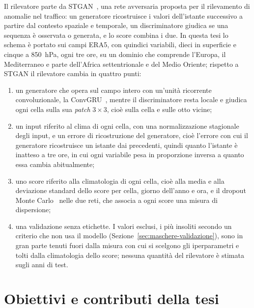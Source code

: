 Il rilevatore parte da STGAN~\cite{deng2022stgan}, una rete avversaria proposta per il rilevamento di anomalie nel traffico: un generatore ricostruisce i valori dell'istante successivo a partire dal contesto spaziale e temporale, un discriminatore giudica se una sequenza è osservata o generata, e lo score combina i due. In questa tesi lo schema è portato sui campi ERA5, con quindici variabili, dieci in superficie e cinque a 850~hPa, ogni tre ore, su un dominio che comprende l'Europa, il Mediterraneo e parte dell'Africa settentrionale e del Medio Oriente; rispetto a STGAN il rilevatore cambia in quattro punti:
\begin{enumerate}
    \item un generatore che opera sul campo intero con un'unità ricorrente convoluzionale, la ConvGRU~\cite{shi2015convlstm,ballas2016convgru}, mentre il discriminatore resta locale e giudica ogni cella sulla sua \emph{patch} $3\times3$, cioè sulla cella e sulle otto vicine;
    \item un input riferito al clima di ogni cella, con una normalizzazione stagionale degli input, e un errore di ricostruzione del generatore, cioè l'errore con cui il generatore ricostruisce un istante dai precedenti, quindi quanto l'istante è inatteso a tre ore, in cui ogni variabile pesa in proporzione inversa a quanto essa cambia abitualmente;
    \item uno score riferito alla climatologia di ogni cella, cioè alla media e alla deviazione standard dello score per cella, giorno dell'anno e ora, e il dropout Monte Carlo~\cite{gal2016dropout} nelle due reti, che associa a ogni score una misura di dispersione;
    \item una validazione senza etichette. I valori esclusi, i più insoliti secondo un criterio che non usa il modello (Sezione~\ref{sec:maschere-validazione}), sono in gran parte tenuti fuori dalla misura con cui si scelgono gli iperparametri e tolti dalla climatologia dello score; nessuna quantità del rilevatore è stimata sugli anni di test.
\end{enumerate}

\section{Obiettivi e contributi della tesi}

